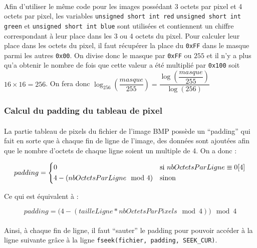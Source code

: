 \documentclass{report}
\begin{document}
\paragraph{} Afin d'utiliser le même code pour les images possédant 3 octets
par pixel et 4 octets par pixel, les variables
\lstinline[style=prog]|unsigned short int red|
\lstinline[style=prog]|unsigned short int green| et
\lstinline[style=prog]|unsigned short int blue| sont utilisées et contiennent
un chiffre correspondant à leur place dans les 3 ou 4 octets du pixel. Pour
calculer leur place dans les octets du pixel, il faut récupérer la place du
\texttt{0xFF} dans le masque parmi les autres \texttt{0x00}. On divise donc le
masque par \texttt{0xFF} ou $255$ et il n'y a plus qu'a obtenir le nombre de
fois que cette valeur a été multiplié par \texttt{0x100} soit $16\times16=256$.
On fera donc $\log_{256}\left(\dfrac{masque}{255}\right) =
\dfrac{\log\left(\dfrac{masque}{255}\right)}{\log\left(256\right)}$

\subsubsection{Calcul du padding du tableau de pixel}

\paragraph{} La partie tableau de pixels du fichier de l'image BMP possède un
``padding'' qui fait en sorte que à chaque fin de ligne de l'image, des données
sont ajoutées afin que le nombre d'octets de chaque ligne soient un multiple de
4. On a donc : 

\begin{equation}
		padding =	\begin{dcases*}
						0 & si $nbOctetsParLigne \equiv 0[4]$\\
						4 - (nbOctetsParLigne \mod 4) & sinon
					\end{dcases*}
\end{equation}

Ce qui est équivalent à :

\begin{equation}
	padding = \big(4 - (tailleLigne * nbOctetsParPixels \mod 4)\big) \mod 4
\end{equation}

\paragraph{} Ainsi, à chaque fin de ligne, il faut ``sauter'' le padding pour
pouvoir accéder à la ligne suivante grâce à la ligne
\lstinline[style=prog]|fseek(fichier, padding, SEEK_CUR)|.
\end{document}
